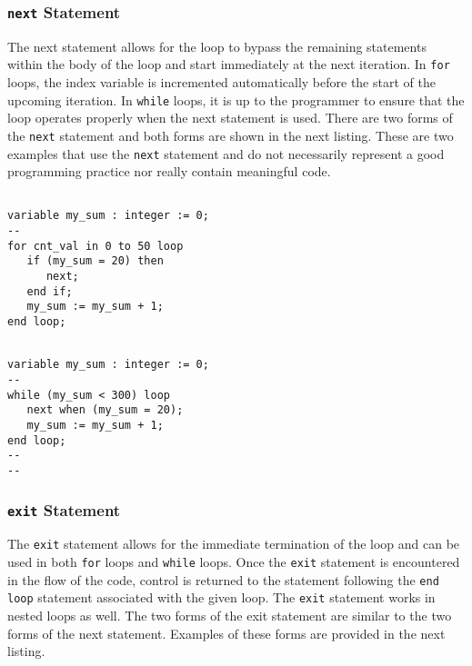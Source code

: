 \subsubsection{\texttt{next} Statement}
The next statement allows for the loop to bypass the remaining statements within the body of the loop and start immediately at the next iteration. In \texttt{for} loops, the index variable is incremented automatically before the start of the upcoming iteration. In \texttt{while} loops, it is up to the programmer to ensure that the loop operates properly when the next statement is used. There are two forms of the \texttt{next} statement and both forms are shown in the next listing. These are two examples that use the \texttt{next} statement and do not necessarily represent a good programming practice nor really contain meaningful code.

\vspace{10pt}
\noindent
\begin{minipage}{0.5\linewidth}
\begin{lstlisting}

variable my_sum : integer := 0;
--
for cnt_val in 0 to 50 loop
   if (my_sum = 20) then
      next;
   end if;
   my_sum := my_sum + 1;
end loop;
\end{lstlisting}
\end{minipage}
\noindent
\begin{minipage}{0.49\linewidth}
\begin{lstlisting}

variable my_sum : integer := 0;
--
while (my_sum < 300) loop
   next when (my_sum = 20);
   my_sum := my_sum + 1;
end loop;
--
--
\end{lstlisting}
\end{minipage}

\subsubsection{\texttt{exit} Statement}
The \texttt{exit} statement allows for the immediate termination of the loop and can be used in both \texttt{for} loops and \texttt{while} loops. Once the \texttt{exit} statement is encountered in the flow of the code, control is returned to the statement following the \texttt{end loop} statement associated with the given loop. The \texttt{exit} statement works in nested loops as well. The two forms of the exit statement are similar to the two forms of the next statement. Examples of these forms are provided in the next listing.

